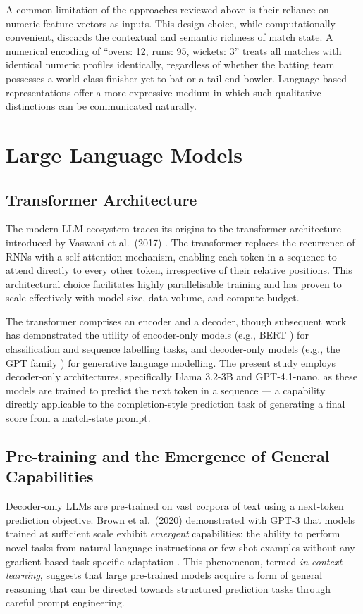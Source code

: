 A common limitation of the approaches reviewed above is their reliance on numeric feature vectors as inputs. This design choice, while computationally convenient, discards the contextual and semantic richness of match state. A numerical encoding of ``overs: 12, runs: 95, wickets: 3'' treats all matches with identical numeric profiles identically, regardless of whether the batting team possesses a world-class finisher yet to bat or a tail-end bowler. Language-based representations offer a more expressive medium in which such qualitative distinctions can be communicated naturally.

\section{Large Language Models}

\subsection{Transformer Architecture}

The modern LLM ecosystem traces its origins to the transformer architecture introduced by Vaswani et al.\ (2017) \cite{vaswani2017attention}. The transformer replaces the recurrence of RNNs with a self-attention mechanism, enabling each token in a sequence to attend directly to every other token, irrespective of their relative positions. This architectural choice facilitates highly parallelisable training and has proven to scale effectively with model size, data volume, and compute budget.

The transformer comprises an encoder and a decoder, though subsequent work has demonstrated the utility of encoder-only models (e.g., BERT \cite{devlin2019bert}) for classification and sequence labelling tasks, and decoder-only models (e.g., the GPT family \cite{brown2020language}) for generative language modelling. The present study employs decoder-only architectures, specifically Llama 3.2-3B and GPT-4.1-nano, as these models are trained to predict the next token in a sequence --- a capability directly applicable to the completion-style prediction task of generating a final score from a match-state prompt.

\subsection{Pre-training and the Emergence of General Capabilities}

Decoder-only LLMs are pre-trained on vast corpora of text using a next-token prediction objective. Brown et al.\ (2020) demonstrated with GPT-3 that models trained at sufficient scale exhibit \textit{emergent} capabilities: the ability to perform novel tasks from natural-language instructions or few-shot examples without any gradient-based task-specific adaptation \cite{brown2020language}. This phenomenon, termed \textit{in-context learning}, suggests that large pre-trained models acquire a form of general reasoning that can be directed towards structured prediction tasks through careful prompt engineering.

